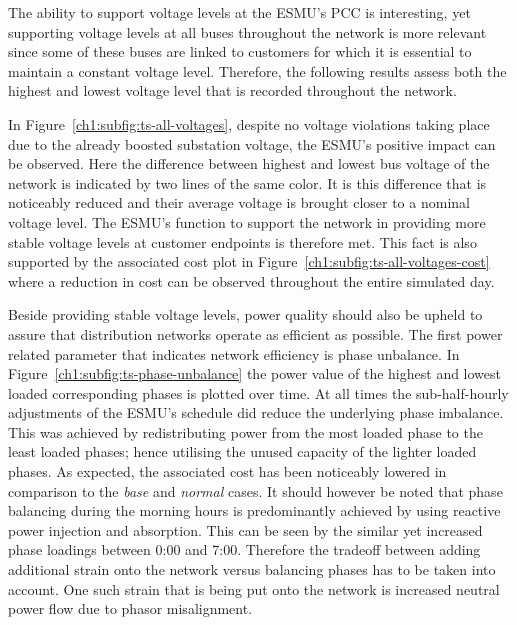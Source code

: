The ability to support voltage levels at the ESMU's PCC is interesting, yet supporting voltage levels at all buses throughout the network is more relevant since some of these buses are linked to customers for which it is essential to maintain a constant voltage level.
Therefore, the following results assess both the highest and lowest voltage level that is recorded throughout the network.



In Figure~\ref{ch1:subfig:ts-all-voltages}, despite no voltage violations taking place due to the already boosted substation voltage, the ESMU's positive impact can be observed.
Here the difference between highest and lowest bus voltage of the network is indicated by two lines of the same color. It is this difference that is noticeably reduced and their average voltage is brought closer to a nominal voltage level.
The ESMU's function to support the network in providing more stable voltage levels at customer endpoints is therefore met.
This fact is also supported by the associated cost plot in Figure~\ref{ch1:subfig:ts-all-voltages-cost} where a reduction in cost can be observed throughout the entire simulated day.



Beside providing stable voltage levels, power quality should also be upheld to assure that distribution networks operate as efficient as possible.
The first power related parameter that indicates network efficiency is phase unbalance.
In Figure~\ref{ch1:subfig:ts-phase-unbalance} the power value of the highest and lowest loaded corresponding phases is plotted over time.
At all times the sub-half-hourly adjustments of the ESMU's schedule did reduce the underlying phase imbalance.
This was achieved by redistributing power from the most loaded phase to the least loaded phases; hence utilising the unused capacity of the lighter loaded phases.
As expected, the associated cost has been noticeably lowered in comparison to the \textit{base} and \textit{normal} cases.
It should however be noted that phase balancing during the morning hours is predominantly achieved by using reactive power injection and absorption.
This can be seen by the similar yet increased phase loadings between 0:00 and 7:00.
Therefore the tradeoff between adding additional strain onto the network versus balancing phases has to be taken into account.
One such strain that is being put onto the network is increased neutral power flow due to phasor misalignment.

